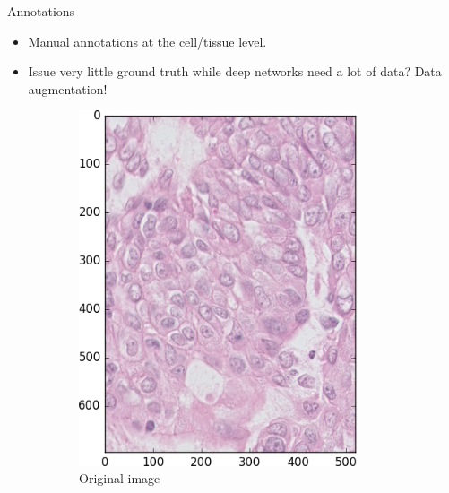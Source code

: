\documentclass{beamer}
\begin{document}
\begin{frame}{Annotations}
\begin{itemize}
\item Manual annotations at the cell/tissue level.
\item Issue very little ground truth while deep networks need a lot of data? Data augmentation! \\
\end{itemize}

\begin{figure}
\begin{multicols}{6}
	\begin{subfigure}{0.2\textwidth}
    \includegraphics[width=0.9\textwidth]{BIS.png}\par 
     \caption{Original image}
     \label{fig:original}
	\end{subfigure}%
	\begin{subfigure}{0.2\textwidth}

\end{subfigure}
\end{multicols}
\end{figure}
\end{frame}
\end{document}
